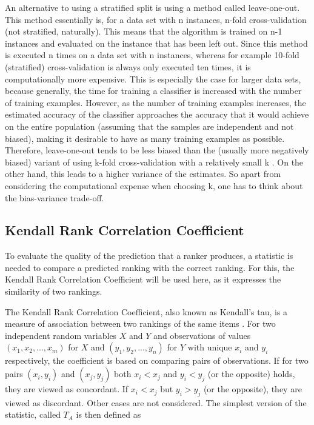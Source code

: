 An alternative to using a stratified split is using a method called leave-one-out. This method essentially is, for a data set with n instances, n-fold cross-validation (not stratified, naturally). This means that the algorithm is trained on n-1 instances and evaluated on the instance that has been left out. Since this method is executed n times on a data set with n instances, whereas for example 10-fold (stratified) cross-validation is always only executed ten times, it is computationally more expensive. This is especially the case for larger data sets, because generally, the time for training a classifier is increased with the number of training examples. However, as the number of training examples increases, the estimated accuracy of the classifier approaches the accuracy that it would achieve on the entire population (assuming that the samples are independent and not biased), making it desirable to have as many training examples as possible. Therefore, leave-one-out tends to be less biased than the (usually more negatively biased) variant of using k-fold cross-validation with a relatively small k \cite{kohavi1995study}. On the other hand, this leads to a higher variance of the estimates. So apart from considering the computational expense when choosing k, one has to think about the bias-variance trade-off.   

\subsection{Kendall Rank Correlation Coefficient}
To evaluate the quality of the prediction that a ranker produces, a statistic is needed to compare a predicted ranking with the correct ranking. For this, the Kendall Rank Correlation Coefficient will be used here, as it expresses the similarity of two rankings.

The Kendall Rank Correlation Coefficient, also known as Kendall's tau, is a measure of association between two rankings of the same items \cite{kendall1938new}. For two independent random variables $X$ and $Y$ and observations of values $(x_1,x_2,...,x_m)$ for $X$ and $(y_1,y_2,...,y_n)$ for $Y$ with unique $x_i$ and $y_i$ respectively, the coefficient is based on comparing pairs of observations. If for two pairs $(x_i,y_i)$ and $(x_j,y_j)$ both $x_i < x_j$ and $y_i < y_j$ (or the opposite) holds, they are viewed as concordant. If $x_i < x_j$ but $y_i > y_j$ (or the opposite), they are viewed as discordant. Other cases are not considered. The simplest version of the statistic, called $T_A$ is then defined as 

